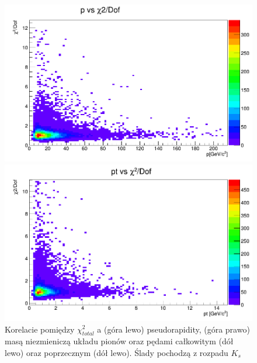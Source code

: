 \begin{figure}[H]
\vspace*{0.5cm} %
\begin{minipage}[t]{0.5\textwidth}
\includegraphics[width=\linewidth]{rozdzial6/JPsi_p_chi2.png}
\end{minipage}
\hspace{\fill}
\begin{minipage}[t]{0.5\textwidth}
\includegraphics[width=\linewidth]{rozdzial6/JPsi_pt_chi2.png}
\end{minipage}
\caption{Korelacie pomiędzy $\chi^2_{total}$  a (góra lewo) pseudorapidity, (góra prawo) masą niezmieniczą układu pionów oraz pędami całkowitym (dół lewo) oraz poprzecznym (dół lewo). Ślady pochodzą z rozpadu $K_s$ } \label{corr_chi2JPsi}
\end{figure}

